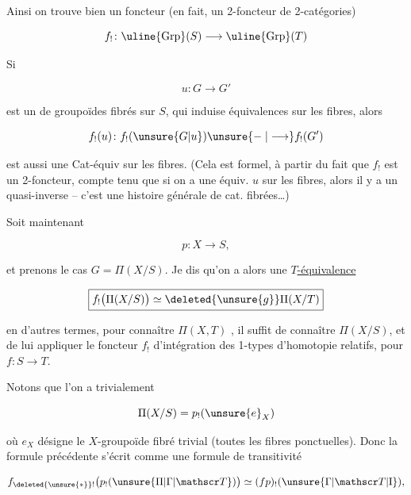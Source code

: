 
Ainsi on trouve bien un foncteur (en fait,  un 2-foncteur de 2-catégories)

\[
f_!\colon\uline{\mathrm{Grp}}(S)\longrightarrow\uline{\mathrm{Grp}}(T)
\]

Si

\[
u\colon G\longrightarrow G'
\]

est un  de groupoïdes fibrés sur $S$, qui induise  équivalences sur les fibres, alors

\[
f_!(u)\colon f_!(\unsure{G|u})\unsure{\mathrel{-}|\longrightarrow}f_!(G')
\]

est aussi une Cat-équiv sur les fibres. (Cela est formel, à partir du fait que $f_!$ est un 2-foncteur, compte tenu que si on a une équiv. $u$ sur les fibres, alors il y a un quasi-inverse -- c'est une histoire générale de cat. fibrées\ldots)

Soit maintenant

\[
p\colon X\longrightarrow S,
\]

et prenons le cas $G=\Pi(X/S)$. Je dis qu'on a alors une \uline{$T$-équivalence} 

\[
\boxed{f_!\bigl(\Pi(X/S)\bigr)\simeq\deleted{\unsure{g}}\Pi(X/T)}
\]

en d'autres termes, pour connaître $\Pi(X,T)$ , il suffit de connaître $\Pi(X/S)$, et de lui appliquer le foncteur $f_!$ d'intégration des 1-types d'homotopie relatifs, pour $f\colon S\longrightarrow T$.

Notons que l'on a trivialement

\[
\Pi(X/S)=p_!(\unsure{e}_X)
\]

où $e_X$ désigne le $X$-groupoïde fibré trivial (toutes les fibres ponctuelles). Donc la formule précédente s'écrit comme une formule de transitivité

\[
f_{\deleted{\unsure{*}}!}\bigl(p_!(\unsure{\Pi|\Gamma|\mathscr T})\bigr)\simeq(fp)_!(\unsure{\Gamma|\mathscr T|\mathrm{I}}),
\]
